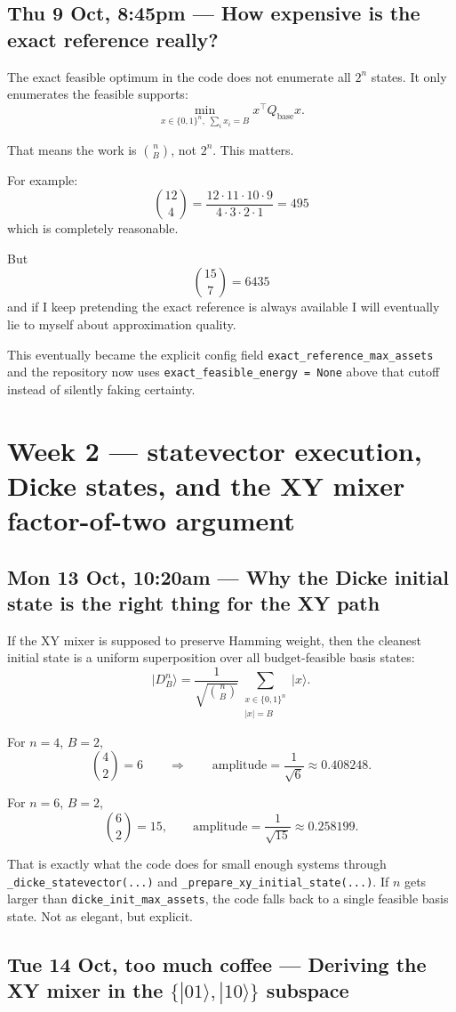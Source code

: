 \documentclass[11pt]{article}
\newcommand{\entry}[2]{\subsection*{#1 --- #2}}
\newcommand{\repo}[1]{\texttt{#1}}
\begin{document}
\entry{Thu 9 Oct, 8:45pm}{How expensive is the exact reference really?}

The exact feasible optimum in the code does not enumerate all \(2^n\) states.
It only enumerates the feasible supports:
\[
\min_{x \in \{0,1\}^n,\; \sum_i x_i = B} x^\top Q_{\text{base}} x.
\]

That means the work is \(\binom{n}{B}\), not \(2^n\). This matters.

For example:
\[
\binom{12}{4} = \frac{12 \cdot 11 \cdot 10 \cdot 9}{4 \cdot 3 \cdot 2 \cdot 1} = 495
\]
which is completely reasonable.

But
\[
\binom{15}{7} = 6435
\]
and if I keep pretending the exact reference is always available I will eventually lie to myself
about approximation quality.

This eventually became the explicit config field
\repo{exact\_reference\_max\_assets} and the repository now uses
\repo{exact\_feasible\_energy = None} above that cutoff instead of silently faking certainty.

\section*{Week 2 --- statevector execution, Dicke states, and the XY mixer factor-of-two argument}

\entry{Mon 13 Oct, 10:20am}{Why the Dicke initial state is the right thing for the XY path}

If the XY mixer is supposed to preserve Hamming weight, then the cleanest initial state is a
uniform superposition over all budget-feasible basis states:
\[
\lvert D^n_B \rangle
=
\frac{1}{\sqrt{\binom{n}{B}}}
\sum_{\substack{x \in \{0,1\}^n \\ |x| = B}}
\lvert x \rangle.
\]

For \(n=4\), \(B=2\),
\[
\binom{4}{2} = 6
\qquad \Rightarrow \qquad
\text{amplitude} = \frac{1}{\sqrt{6}} \approx 0.408248.
\]

For \(n=6\), \(B=2\),
\[
\binom{6}{2}=15,
\qquad
\text{amplitude} = \frac{1}{\sqrt{15}} \approx 0.258199.
\]

That is exactly what the code does for small enough systems through
\repo{\_dicke\_statevector(...)} and \repo{\_prepare\_xy\_initial\_state(...)}.
If \(n\) gets larger than \repo{dicke\_init\_max\_assets}, the code falls back to a single feasible
basis state. Not as elegant, but explicit.

\entry{Tue 14 Oct, too much coffee}{Deriving the XY mixer in the \(\{|01\rangle,|10\rangle\}\) subspace}
\end{document}
